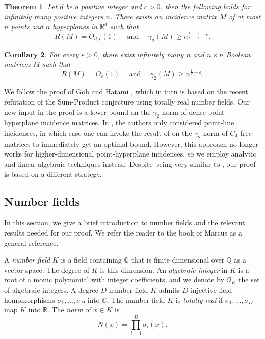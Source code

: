 \documentclass[11pt]{article}
\theoremstyle{plain}
\newtheorem{theorem}{Theorem}[section]
\newtheorem{corollary}[theorem]{Corollary}
\theoremstyle{definition}
\newcommand{\eps}{\varepsilon}
\begin{document}
	
	\begin{theorem}\label{thm:cc}
		Let $d$ be a positive integer and $c>0$, then the following holds for infinitely many positive integers $n$. There exists an incidence matrix $M$ of at most $n$ points and  $n$ hyperplanes in $\mathbb{R}^d$ such that 
		$$R(M)=O_{d,c}(1)\quad\text{ and }\quad\gamma_2(M)\geq n^{\frac{1}{2}-\frac{2}{d}-c}.$$
	\end{theorem}

    \begin{corollary}
    For every $\eps>0$, there exist infinitely many $n$ and $n\times n$ Boolean matrices $M$ such that
    $$R(M)=O_{\eps}(1)\quad\text{ and }\quad\gamma_2(M)\geq n^{\frac{1}{2}-\eps}.$$
    \end{corollary}
	
	We follow the proof of Goh and Hatami \cite{GH_totally_real}, which in turn is based on the recent refutation of the Sum-Product conjecture \cite{BSSZ} using totally real number fields. Our new input in the proof is a lower bound on the $\gamma_2$-norm of dense point-hyperplane incidence matrices. In \cite{GH_totally_real}, the authors only considered point-line incidences, in which case one can invoke the result of \cite{BHT} on the $\gamma_2$-norm of $C_4$-free matrices to immediately get an optimal bound. However, this approach no longer works for higher-dimensional point-hyperplane incidences, so we employ analytic and linear algebraic techniques instead. Despite  being very similar to , our proof is based on a different strategy.
	
	\subsection{Number fields}
	
	In this section, we give a brief introduction to number fields and the relevant results needed for our proof. We refer the reader to the book of Marcus \cite{Marcus} as a general reference.
	
	A \emph{number field} $K$ is a field containing $\mathbb{Q}$ that is finite dimensional over $\mathbb{Q}$ as a vector space. The degree of $K$ is this dimension. An \emph{algebraic integer} in $K$ is a root of a monic polynomial with integer coefficients, and we denote by $\mathcal{O}_K$ the set of algebraic integers. A degree $D$ number field $K$ admits $D$ injective field homomorphisms $\sigma_1,\dots,\sigma_D$ into $\mathbb{C}$. The number field $K$ is \emph{totally real} if $\sigma_1,\dots,\sigma_D$ map $K$ into $\mathbb{R}$. The \emph{norm} of $x\in K$ is 
	$$N(x)=\prod_{i=1}^D \sigma_i(x).$$
	
\end{document}

